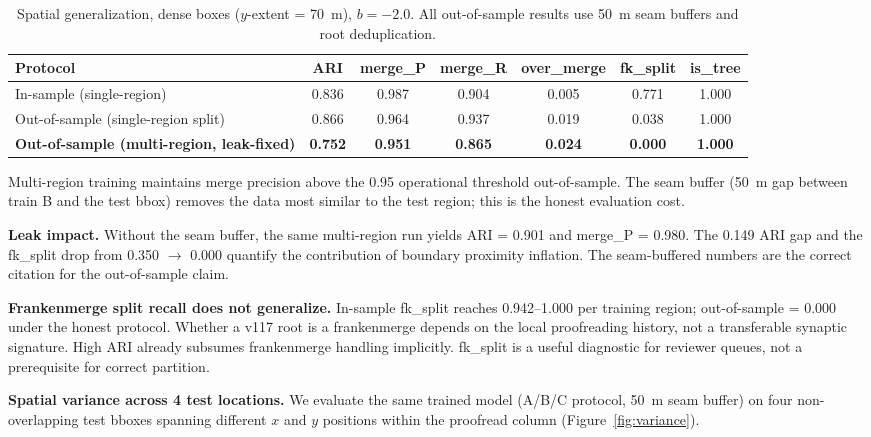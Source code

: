 \documentclass[10pt,letterpaper]{article}
\begin{document}
\begin{table}[h]
\centering
\caption{Spatial generalization, dense boxes ($y$-extent = 70~\textmu{}m), $b = -2.0$.
All out-of-sample results use 50~\textmu{}m seam buffers and root deduplication.}
\label{tab:spatial}
\small
\begin{tabular}{lcccccc}
\toprule
Protocol & ARI & merge\_P & merge\_R & over\_merge & fk\_split & is\_tree \\
\midrule
In-sample (single-region)              & 0.836 & 0.987 & 0.904 & 0.005 & 0.771 & 1.000 \\
Out-of-sample (single-region split)    & 0.866 & 0.964 & 0.937 & 0.019 & 0.038 & 1.000 \\
\textbf{Out-of-sample (multi-region, leak-fixed)} & \textbf{0.752} & \textbf{0.951} & \textbf{0.865} & \textbf{0.024} & \textbf{0.000} & \textbf{1.000} \\
\bottomrule
\end{tabular}
\end{table}

Multi-region training maintains merge precision above the 0.95 operational threshold
out-of-sample. The seam buffer (50~\textmu{}m gap between train B and the test bbox)
removes the data most similar to the test region; this is the honest evaluation cost.

\textbf{Leak impact.} Without the seam buffer, the same multi-region run yields
ARI = 0.901 and merge\_P = 0.980. The 0.149 ARI gap and the fk\_split drop from
0.350 $\to$ 0.000 quantify the contribution of boundary proximity inflation. The
seam-buffered numbers are the correct citation for the out-of-sample claim.

\textbf{Frankenmerge split recall does not generalize.} In-sample fk\_split reaches
0.942--1.000 per training region; out-of-sample = 0.000 under the honest protocol.
Whether a v117 root is a frankenmerge depends on the local proofreading history, not a
transferable synaptic signature. High ARI already subsumes frankenmerge handling
implicitly. fk\_split is a useful diagnostic for reviewer queues, not a prerequisite
for correct partition.

\textbf{Spatial variance across 4 test locations.} We evaluate the same trained model
(A/B/C protocol, 50~\textmu{}m seam buffer) on four non-overlapping test bboxes spanning
different $x$ and $y$ positions within the proofread column (Figure~\ref{fig:variance}).
\end{document}
